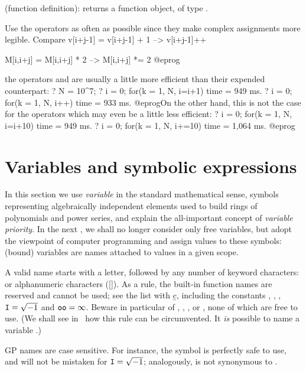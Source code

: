 \kbd{->} (function definition):  returns a
function object, of type .

 Use the \kbd{=} operators as often as possible
since they make complex assignments more legible. Compare
\bprog
v[i+j-1] = v[i+j-1] + 1    -->    v[i+j-1]++

M[i,i+j] = M[i,i+j] * 2    -->    M[i,i+j] *= 2
@eprog

 the operators \kbd{++}
and \kbd{--} are usually a little more efficient than their expended
counterpart:
\bprog
? N = 10^7;
? i = 0; for(k = 1, N, i=i+1)
time = 949 ms.
? i = 0; for(k = 1, N, i++)
time = 933 ms.
@eprog\noindent On the other hand, this is not the case for the
\kbd{=} operators which may even be a little less efficient:
\bprog
? i = 0; for(k = 1, N, i=i+10)
time = 949 ms.
? i = 0; for(k = 1, N, i+=10)
time = 1,064 ms.
@eprog

\section{Variables and symbolic expressions}\label{se:varsymb}
In this section we use \emph{variable} in the standard mathematical
sense, symbols representing algebraically independent elements used to build
rings of polynomials and power series, and explain the all-important concept
of \emph{variable priority}. In the next , we shall no
longer consider only free variables, but adopt the viewpoint of computer
programming and assign values to these symbols: (bound) variables are names
attached to values in a given scope.

\label{se:varname} A valid name starts with a letter,
followed by any number of keyword characters: \kbd{\_} or alphanumeric
characters ([]). As a rule, the built-in function names are
reserved and cannot be used; see the list with \b{c}, including the constants
, , , ${\tt I}=\sqrt{-1}$ and ${\tt oo} =
\infty$. Beware in particular of , , ,
 or , none of which are free to use. (We shall see
in~ how this rule can be circumvented. It \emph{is} possible
to name a  variable .)

GP names are case sensitive. For instance, the symbol  is perfectly
safe to use, and will not be mistaken for ${\tt I} = \sqrt{-1}$; analogously,
 is not synonymous to .

